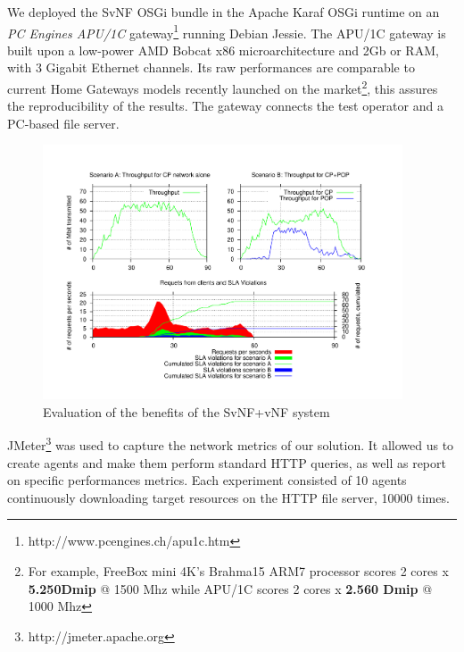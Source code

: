 We deployed the SvNF OSGi bundle in the Apache Karaf OSGi runtime on an \textit{PC Engines APU/1C} gateway\footnote{http://www.pcengines.ch/apu1c.htm} running Debian Jessie. 
The APU/1C gateway is built upon a low-power AMD Bobcat x86 microarchitecture and 2Gb or RAM, with 3 Gigabit Ethernet channels. Its raw performances are comparable to current Home Gateways models recently launched on the market\footnote{For example, FreeBox mini 4K's Brahma15 ARM7 processor scores 2 cores x \textbf{5.250Dmip} @ 1500 Mhz while APU/1C scores 2 cores x \textbf{2.560 Dmip} @ 1000 Mhz}, this assures the reproducibility of the results. The gateway connects the test operator and a PC-based file server.



\begin{figure}
  \begin{center}
    \includegraphics[width=0.95\textwidth]{fig/CP+POP_evaluation.pdf}
  \end{center}
  \caption{ Evaluation of the benefits of the SvNF+vNF system
    \label{fig:cppopeval}
  }
\end{figure}	







JMeter\footnote{http://jmeter.apache.org} was used to capture the network metrics of our solution.
It allowed us to create agents and make them perform standard HTTP queries, as well as report on specific performances metrics. Each experiment consisted of 10 agents continuously downloading target resources on the HTTP file server, 10000 times.

